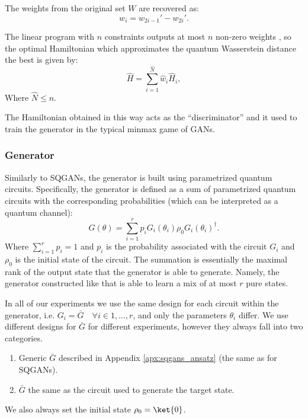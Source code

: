The weights from the original set $W$ are recovered as:
\begin{equation}
  w_i = w_{2i-1}' - w_{2i}'.
\end{equation}


The linear program with $n$ constraints outputs at most $n$ non-zero
weights \cite{10.5555/548834}, so the optimal Hamiltonian which approximates the
quantum Wasserstein distance the best is given by:
\begin{equation}
\hat{H} = \sum_{i=1}^{\hat{N}}\hat{w}_i\hat{H}_i,
\end{equation}
Where $\hat{N} \leq n$.

The Hamiltonian obtained in this way acts as the ``discriminator'' and it used
to train the generator in the typical minmax game of GANs.

\subsubsection{Generator}
Similarly to SQGANs, the generator is built using parametrized quantum circuits.
Specifically, the generator is defined as a sum of parametrized quantum circuits
with the corresponding probabilities (which can be interpreted as a quantum channel):
\begin{equation}
G(\theta) = \sum_{i=1}^r p_iG_i(\theta_i)\rho_0G_i(\theta_i)^\dagger.
\end{equation}
Where $\sum_{i=1}^r p_i = 1$ and $p_i$ is the probability associated with the
circuit $G_i$ and $\rho_0$ is the initial state of the circuit. The summation is
essentially the maximal rank of the output state that the generator is able to
generate. Namely, the generator constructed like that is able to learn a mix of
at most $r$ pure states.

In all of our experiments we use the same design for each circuit within the
generator, i.e. $G_i = \bar{G} \quad \forall i \in 1,\ldots, r$, and only the
parameters $\theta_i$ differ. We use different designs for $\bar{G}$ for
different experiments, however they always fall into two categories.
\begin{enumerate}
\item Generic $\bar{G}$ described in Appendix \ref{apx:sqgans_ansatz} (the same as for SQGANs).
\item $\bar{G}$ the same as the circuit used to generate the target state.
\end{enumerate}
We also always set the initial state $\rho_0 = \ket{0}$.

